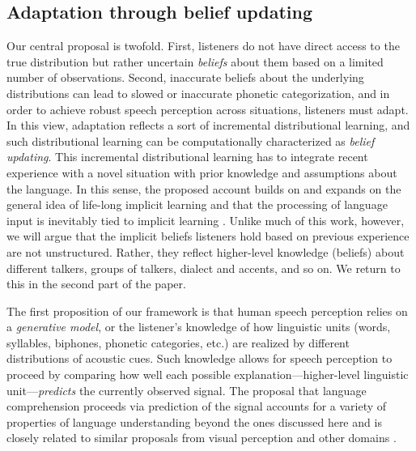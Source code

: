 \subsection{Adaptation through belief updating}
\label{sec:robust-speech-perc}



Our central proposal is twofold.  First, listeners do not have direct access to the true distribution but rather uncertain \emph{beliefs} about them based on a limited number of observations.  Second, inaccurate beliefs about the underlying distributions can lead to slowed or inaccurate phonetic categorization, and in order to achieve robust speech perception across situations, listeners must adapt.  In this view, adaptation reflects a sort of incremental distributional learning,
and such distributional learning can be computationally characterized as \emph{belief updating}. This incremental distributional learning has to integrate recent experience with a novel situation with prior knowledge and assumptions about the language. In this sense, the proposed account builds on and expands on the general idea of life-long implicit learning \autocite{Botvinick2004,Chang2006,Elman1990} and that the processing of language input is inevitably tied to implicit learning \autocite[e.g.,][]{Clark2013,Dell2014,Jaeger2013a}. Unlike much of this work, however, we will argue that the implicit beliefs listeners hold based on previous experience are not unstructured. Rather, they reflect higher-level knowledge (beliefs) about different talkers, groups of talkers, dialect and accents, and so on.  We return to this in the second part of the paper.

The first proposition of our framework is that human speech perception relies on a \emph{generative model}, or the listener's knowledge of how linguistic units (words, syllables, biphones, phonetic categories, etc.) are realized by different distributions of acoustic cues.  Such knowledge allows for speech perception to proceed by comparing how well each possible explanation---higher-level linguistic unit---\emph{predicts} the currently observed signal.  The proposal that language comprehension proceeds via prediction of the signal accounts for a variety of properties of language understanding beyond the ones discussed here \autocite[cf.][]{Dell2014,Farmer2013,Jaeger2013a,MacDonald2013,Pickering2013} and is closely related to similar proposals from visual perception and other domains \autocite{Clark2013,Friston2005,Hinton2007,Huang2011,Rao1999}.

